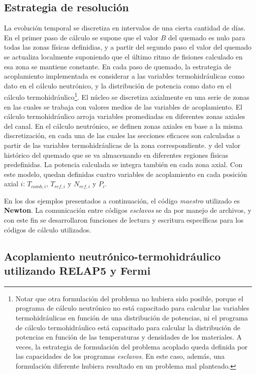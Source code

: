 \subsection*{Estrategia de resolución}
\label{3:modelo-nt}

La evolución temporal se discretiza en intervalos de una cierta cantidad de días.
En el primer paso de cálculo se supone que el valor $B$ del quemado es nulo para todas las zonas físicas definidias,
y a partir del segundo paso el valor del quemado se actualiza localmente suponiendo que el último ritmo de fisiones calculado en esa zona se mantiene constante.
En cada paso de quemado,
la estrategia de acoplamiento implementada es considerar a las variables termohidráulicas como dato en el cálculo neutrónico,
y la distribución de potencia como dato en el cálculo termohidráulico\footnote{
Notar que otra formulación del problema no hubiera sido posible,
porque el programa de cálculo neutrónico no está capacitado para calcular las variables termohidráulicas en función de una distribución de potencias,
ni el programa de cálculo termohidráulico está capacitado para calcular la distribución de potencias en función de las temperaturas y densidades de los materiales.
A veces, la estrategia de formulación del problema acoplado queda definida por las capacidades de los programas \textit{esclavos}.
En este caso, además, una formulación diferente hubiera resultado en un problema mal planteado.
}.
El núcleo se discretiza axialmente en una serie de zonas en las cuales se trabaja con valores medios de las variables de acoplamiento.
El cálculo termohidráulico arroja variables promediadas en diferentes zonas axiales del canal.
En el cálculo neutrónico, se definen zonas axiales en base a la misma discretización,
en cada una de las cuales las secciones eficaces son calculadas a partir de las variables termohidráulicas de la zona correspondiente.
y del valor histórico del quemado que se va almacenando en diferentes regiones físicas predefinidas.
La potencia calculada se integra también en cada zona axial.
Con este modelo, quedan definidas cuatro variables de acoplamiento en cada posición axial $i$: $T_{comb,i}$, $T_{ref,i}$ y $N_{ref,i}$ y $P_i$.

En los dos ejemplos presentados a continuación, el código \textit{maestro} utilizado es \textbf{Newton}.
La comunicación entre códigos \textit{esclavos} se da por manejo de archivos,
y con este fin se desarrollaron funciones de lectura y escritura específicas para los códigos de cálculo utilizados.

\subsection*{Acoplamiento neutrónico-termohidráulico utilizando \textbf{RELAP5} y \textbf{Fermi}}
\label{3:relap-fermi}

